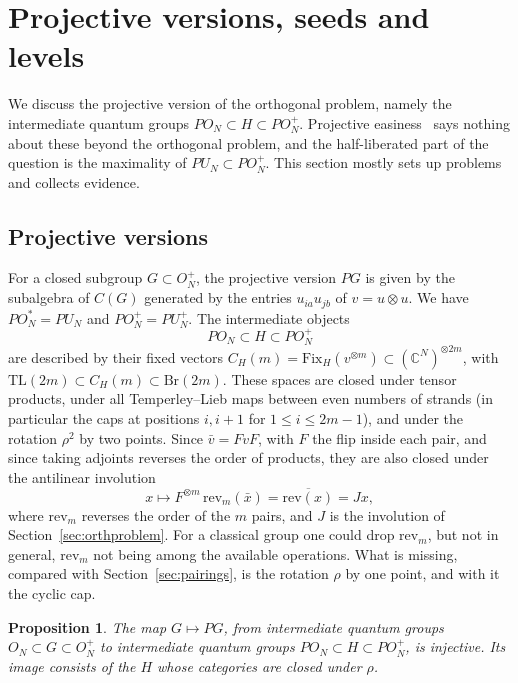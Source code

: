 \documentclass[11pt]{amsart}
\newtheorem{proposition}[theorem]{Proposition}
\theoremstyle{definition}
\theoremstyle{remark}
\theoremstyle{plain}
\numberwithin{equation}{section}
\numberwithin{table}{section}
\newcommand{\C}{\mathbb C}
\newcommand{\TL}{\mathrm{TL}}
\newcommand{\Br}{\mathrm{Br}}
\newcommand{\Fix}{\mathrm{Fix}}
\begin{document}

\section{Projective versions, seeds and levels}\label{sec:related}

We discuss the projective version of the orthogonal problem, namely the intermediate quantum groups
$PO_N\subset H\subset PO_N^+$. Projective easiness~\cite{bme} says nothing about these beyond
the orthogonal problem, and the half-liberated part of the question is the maximality of $PU_N\subset PO_N^+$. This section mostly sets up problems and collects evidence.

\subsection{Projective versions}

For a closed subgroup $G\subset O_N^+$, the projective version $PG$ is given by the subalgebra of $C(G)$ generated by the
entries $u_{ia}u_{jb}$ of $v=u\otimes u$. We have $PO_N^*=PU_N$ and $PO_N^+=PU_N^+$. The intermediate objects
\[
PO_N\subset H\subset PO_N^+
\]
are described by their fixed vectors $C_H(m)=\Fix_H(v^{\otimes m})\subset(\C^N)^{\otimes2m}$, with
$\TL(2m)\subset C_H(m)\subset\Br(2m)$. These spaces are closed under tensor products, under all Temperley--Lieb maps between
even numbers of strands (in particular the caps at positions $i,i+1$ for $1\le i\le 2m-1$), and under the rotation $\rho^2$ by
two points. Since $\bar v=FvF$, with $F$ the flip inside each pair, and since taking adjoints reverses the order of products,
they are also closed under the antilinear involution
\[
x\mapsto F^{\otimes m}\,\mathrm{rev}_m(\bar x)=\overline{\mathrm{rev}(x)}=Jx,
\]
where $\mathrm{rev}_m$ reverses the order of the $m$ pairs, and $J$ is the involution of Section~\ref{sec:orthproblem}. For a classical group one could
drop $\mathrm{rev}_m$, but not in general, $\mathrm{rev}_m$ not being among the available operations.
What is missing, compared with Section~\ref{sec:pairings}, is the rotation $\rho$ by one point, and with it the cyclic cap.

\begin{proposition}\label{prop:inj}
The map $G\mapsto PG$, from intermediate quantum groups $O_N\subset G\subset O_N^+$ to intermediate quantum groups
$PO_N\subset H\subset PO_N^+$, is injective. Its image consists of the $H$ whose categories are closed under $\rho$.
\end{proposition}
\end{document}
